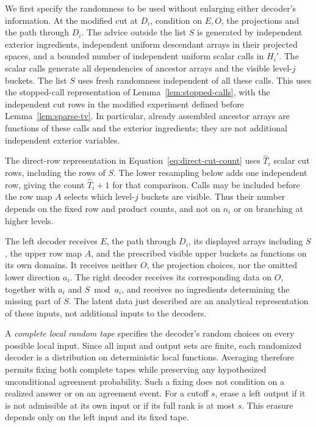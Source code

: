 We first specify the randomness to be used without enlarging either
decoder's information.  At the modified cut at $D_i$, condition on
$E,O$, the projections and the path through $D_i$.  The advice outside the
list $S$ is generated by independent exterior ingredients, independent
uniform descendant arrays in their projected spaces, and a bounded
number of independent uniform scalar calls in $H_i'$.  The scalar calls
generate all dependencies of ancestor arrays and the visible level-$j$
buckets.  The list $S$ uses fresh randomness independent of all these
calls.  This uses the stopped-call representation of
Lemma~\ref{lem:stopped-calls}, with the independent cut rows in the modified
experiment defined before Lemma~\ref{lem:sparse-tv}.  In particular, already assembled ancestor arrays
are functions of these calls and the exterior ingredients; they are not
additional independent exterior variables.

The direct-row representation in Equation~\eqref{eq:direct-cut-count}
uses $\widehat T_i$ scalar cut rows, including the rows of $S$.
The lower resampling below adds one independent row, giving the count
$\widehat T_i+1$ for that comparison.
Calls may be included before the row map $A$ selects which level-$j$
buckets are visible.  Thus their number depends on the fixed row and
product counts, and not on $n_i$ or on branching at higher levels.

The left decoder receives $E$, the path through $D_i$, its displayed
arrays including $S$, the upper row map $A$, and the prescribed visible
upper buckets as functions on its own domains.  It receives neither
$O$, the projection choices, nor the omitted lower direction $a_i$.
The right decoder receives its corresponding data on $O$, together with
$a_i$ and $S\bmod a_i$, and receives no ingredients determining the
missing part of $S$.  The latent data just described are an analytical
representation of these inputs, not additional inputs to the decoders.

A \emph{complete local random tape} specifies the decoder's random
choices on every possible local input.  Since all input and output sets
are finite, each randomized decoder is a distribution on deterministic
local functions.  Averaging therefore permits fixing both complete
tapes while preserving any hypothesized unconditional agreement
probability.  Such a fixing does not condition on a realized answer or
on an agreement event.  For a cutoff $s$, erase a left output if it is
not admissible at its own input or if its full rank is at most $s$.
This erasure depends only on the left input and its fixed tape.

